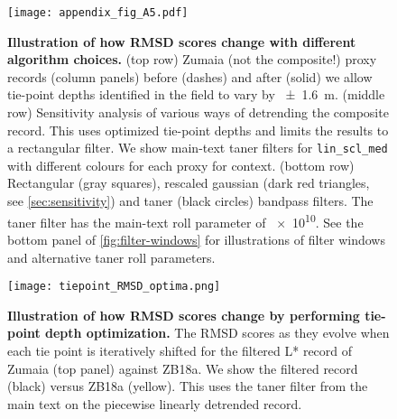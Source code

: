 \documentclass[draft]{agujournal2019}
\begin{document}
\begin{figure}
  \centering \texttt{[image: appendix\_fig\_A5.pdf]}
  \caption{
    \textbf{Illustration of how RMSD scores change with different algorithm choices.}
    (top row)\label{fig:full-RMSD-tie}
    Zumaia (not the composite!) proxy records (column panels)
    before (dashes) and after (solid) we allow tie-point depths identified in the field to vary by \qty{\pm1.6}{\metre}.
    (middle row)\label{fig:full-RMSD-detrend} Sensitivity analysis of various ways of detrending the composite record.
    This uses optimized tie-point depths and limits the results to a rectangular filter.
    We show main-text taner filters for \texttt{lin\_scl\_med} with different colours for each proxy for context.
    (bottom row)\label{fig:full-RMSD-filter} Rectangular (gray squares), rescaled gaussian (dark red triangles, see \ref{sec:sensitivity}) and taner (black circles) bandpass filters.
    The taner filter has the main-text roll parameter of \num{e10}.
    See the bottom panel of \cref{fig:filter-windows} for illustrations of filter windows and alternative taner roll parameters.
    }
\end{figure}


\begin{figure}
  \centering \texttt{[image: tiepoint\_RMSD\_optima.png]}
  \caption{\label{fig:tiepoint-RMSD-optima}
    \textbf{Illustration of how RMSD scores change by performing tie-point depth optimization.}
    The \gls{RMSD} scores as they evolve when each tie point is iteratively shifted for the filtered \gls{L*} record of Zumaia (top panel) against ZB18a.
    We show the filtered record (black) versus ZB18a (yellow).
    This uses the taner filter from the main text on the piecewise linearly detrended record.
    }
\end{figure}
\end{document}
